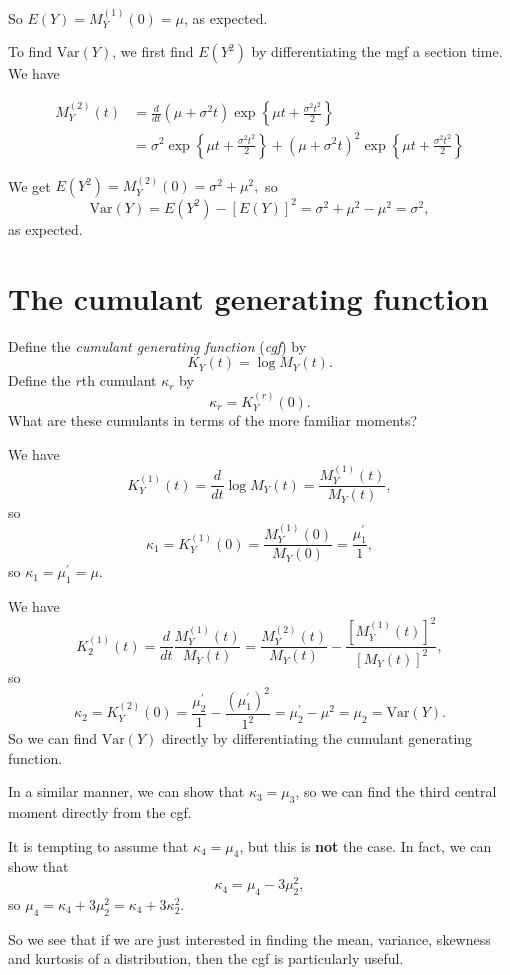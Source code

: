 \documentclass[]{book}
\theoremstyle{definition}
\theoremstyle{definition}
\theoremstyle{definition}
\theoremstyle{remark}
\begin{document}
So \(E(Y) = M_Y^{(1)}(0) = \mu\), as expected.

To find \(\text{Var}(Y)\), we first find \(E(Y^2)\) by differentiating
the mgf a section time. We have

\begin{align*}
M_Y^{(2)}(t) &= \frac{d}{dt} (\mu + \sigma^2 t) \exp \left\{\mu t + \frac{\sigma^2 t^2}{2} \right\} \\
&= \sigma^2  \exp \left\{\mu t + \frac{\sigma^2 t^2}{2} \right\}
+ (\mu + \sigma^2 t)^2 \exp \left\{\mu t + \frac{\sigma^2 t^2}{2} \right\}
\end{align*}

We get \(E(Y^2) = M_Y^{(2)}(0) = \sigma^2 + \mu^2,\) so
\[\text{Var}(Y) = E(Y^2) - [E(Y)]^2 = \sigma^2 + \mu^2 - \mu^2 = \sigma^2,\]
as expected.

\section{The cumulant generating
function}\label{the-cumulant-generating-function}

Define the \emph{cumulant generating function} (\emph{cgf}) by
\[K_Y(t) = \log M_Y(t).\] Define the \(r\)th cumulant \(\kappa_r\) by
\[\kappa_r = K_Y^{(r)}(0).\] What are these cumulants in terms of the
more familiar moments?

We have
\[K_Y^{(1)}(t) = \frac{d}{dt} \log M_Y(t) = \frac{M_Y^{(1)}(t)}{M_Y(t)},\]
so
\[\kappa_1 = K_Y^{(1)}(0) = \frac{M_Y^{(1)}(0)}{M_Y(0)} = \frac{\mu_1^\prime}{1},\]
so \(\kappa_1 = \mu_1^\prime = \mu\).

We have \[K_2^{(1)}(t) = \frac{d}{dt}\frac{M_Y^{(1)}(t)}{M_Y(t)} =
  \frac{M_Y^{(2)}(t)}{M_Y(t)} -
  \frac{\left[M_Y^{(1)}(t)\right]^2}{\left[M_Y(t)\right]^2},\] so
\[\kappa_2 = K_Y^{(2)}(0)
  = \frac{\mu_2^\prime}{1} - \frac{\left(\mu_1^\prime\right)^2}{1^2}
  = \mu_2^\prime - \mu^2 = \mu_2 = \text{Var}(Y).\] So we can find
\(\text{Var}(Y)\) directly by differentiating the cumulant generating
function.

In a similar manner, we can show that \(\kappa_3 = \mu_3\), so we can
find the third central moment directly from the cgf.

It is tempting to assume that \(\kappa_4 = \mu_4\), but this is
\textbf{not} the case. In fact, we can show that
\[\kappa_4 = \mu_4 - 3 \mu_2^2,\] so
\(\mu_4 = \kappa_4 + 3 \mu_2^2 = \kappa_4 + 3 \kappa_2^2\).

So we see that if we are just interested in finding the mean, variance,
skewness and kurtosis of a distribution, then the cgf is particularly
useful.
\end{document}
